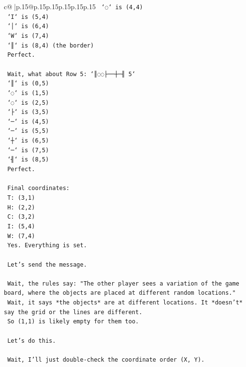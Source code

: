 \documentclass{article}
\begin{document}
{\begin{supertabular}{c@{$\;$}|p{.15\linewidth}@{}p{.15\linewidth}p{.15\linewidth}p{.15\linewidth}p{.15\linewidth}p{.15\linewidth}}
{{{\texttt{    `◌` is (4,4)} \\
\texttt{    `I` is (5,4)} \\
\texttt{    `│` is (6,4)} \\
\texttt{    `W` is (7,4)} \\
\texttt{    `║` is (8,4) (the border)} \\
\texttt{    Perfect.} \\
\\ 
\texttt{    Wait, what about Row 5: `║◌◌├──┼─╢ 5`} \\
\texttt{    `║` is (0,5)} \\
\texttt{    `◌` is (1,5)} \\
\texttt{    `◌` is (2,5)} \\
\texttt{    `├` is (3,5)} \\
\texttt{    `─` is (4,5)} \\
\texttt{    `─` is (5,5)} \\
\texttt{    `┼` is (6,5)} \\
\texttt{    `─` is (7,5)} \\
\texttt{    `╢` is (8,5)} \\
\texttt{    Perfect.} \\
\\ 
\texttt{    Final coordinates:} \\
\texttt{    T: (3,1)} \\
\texttt{    H: (2,2)} \\
\texttt{    C: (3,2)} \\
\texttt{    I: (5,4)} \\
\texttt{    W: (7,4)} \\
\texttt{    Yes. Everything is set.} \\
\\ 
\texttt{    Let's send the message.} \\
\\ 
\texttt{    Wait, the rules say: "The other player sees a variation of the game board, where the objects are placed at different random locations."} \\
\texttt{    Wait, it says *the objects* are at different locations. It *doesn't* say the grid or the lines are different.} \\
\texttt{    So (1,1) is likely empty for them too.} \\
\\ 
\texttt{    Let's do this.} \\
\\ 
\texttt{    Wait, I'll just double{-}check the coordinate order (X, Y).} \\
}}}
\end{supertabular}}
\end{document}
